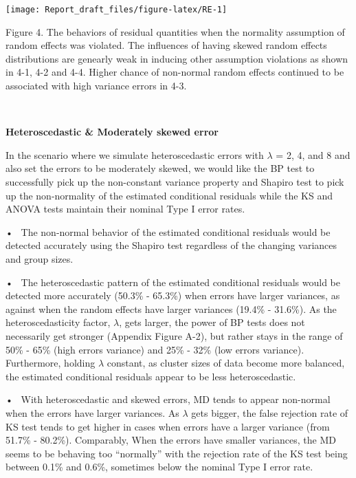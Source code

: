 \documentclass[12pt]{article}
\begin{document}
\begin{center}\texttt{[image: Report\_draft\_files/figure-latex/RE-1]} \end{center}

\vspace{-8pt}

\begin{spacing}{0.5}
\begingroup
{}\fontsize{6.5}{16}\selectfont
Figure 4. The behaviors of residual quantities when the normality assumption of random effects was violated.
The influences of having skewed random effects distributions are genearly weak in inducing other assumption violations as shown in 4-1, 4-2 and 4-4. Higher chance of non-normal random effects continued to be associated with high variance errors in 4-3. 
\endgroup
\end{spacing}

~

\textbf{Heteroscedastic \& Moderately skewed error}

In the scenario where we simulate heteroscedastic errors with
\(\lambda\) = 2, 4, and 8 and also set the errors to be moderately
skewed, we would like the BP test to successfully pick up the
non-constant variance property and Shapiro test to pick up the
non-normality of the estimated conditional residuals while the KS and
ANOVA tests maintain their nominal Type I error rates.

• ~The non-normal behavior of the estimated conditional residuals would
be detected accurately using the Shapiro test regardless of the changing
variances and group sizes.

• ~The heteroscedastic pattern of the estimated conditional residuals
would be detected more accurately (50.3\% - 65.3\%) when errors have
larger variances, as against when the random effects have larger
variances (19.4\% - 31.6\%). As the heteroscedasticity factor,
\(\lambda\), gets larger, the power of BP tests does not necessarily get
stronger (Appendix Figure A-2), but rather stays in the range of 50\% -
65\% (high errors variance) and 25\% - 32\% (low errors variance).
Furthermore, holding \(\lambda\) constant, as cluster sizes of data
become more balanced, the estimated conditional residuals appear to be
less heteroscedastic.

• ~With heteroscedastic and skewed errors, MD tends to appear non-normal
when the errors have larger variances. As \(\lambda\) gets bigger, the
false rejection rate of KS test tends to get higher in cases when errors
have a larger variance (from 51.7\% - 80.2\%). Comparably, When the
errors have smaller variances, the MD seems to be behaving too
``normally'' with the rejection rate of the KS test being between 0.1\%
and 0.6\%, sometimes below the nominal Type I error rate.
\end{document}
